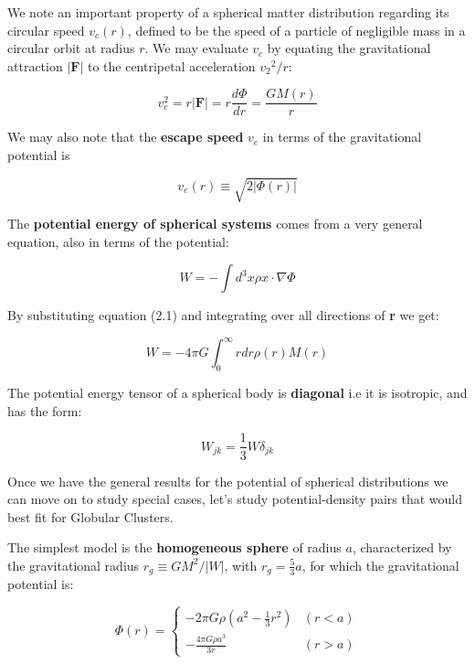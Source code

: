 We note an important property of a spherical matter distribution regarding its circular speed $v_{c}(r)$, defined to be the speed of a particle of negligible mass in a circular orbit at radius $r$. We may evaluate $v_{c}$ by equating the gravitational attraction $|\textbf{F}|$  to the centripetal acceleration ${v_{2}}^{2}/r$:

\begin{equation}
v_{c}^{2}=r|\textbf{F}|=r\frac{d\Phi}{dr}=\frac{GM(r)}{r}
\end{equation}

We may also note that the \textbf{escape speed} $v_{e}$ in terms of the gravitational potential is

\begin{equation}
v_{e}(r)\equiv\sqrt{2|\Phi(r)|}
\end{equation}

The \textbf{potential energy of spherical systems}  comes from a very general equation, also in terms of the potential:

\begin{equation}
W=-\int d^{3}x\rho x\cdot\nabla\Phi
\end{equation}

By substituting equation (2.1) and integrating over all directions of \textbf{r} we get:

\begin{equation}
W=-4\pi G\int_{0}^{\infty}rdr\rho(r)M(r)
\end{equation}

The potential energy tensor of a spherical body is \textbf{diagonal} i.e it is isotropic, and has the form:

\begin{equation}
W_{jk}=\frac{1}{3} W\delta_{jk}
\end{equation}

Once we have the general results for the potential of spherical distributions we can move on to study special cases, let's study potential-density pairs that would best fit for Globular Clusters.

The simplest model is the \textbf{homogeneous sphere} of radius $a$, characterized by the gravitational radius $r_{g}\equiv GM^{2}/|W|$, with $r_{g}=\frac{5}{3}a$, for which the gravitational potential is:

\begin{equation}
\Phi(r) = \left\lbrace
\begin{array}{ll}
-2\pi G\rho\left(a^{2}-\frac{1}{3}r^{2}\right) & (r<a)\\
-\frac{4\pi G\rho a^{3}}{3r} & (r>a)
\end{array}
\right.
\end{equation} 

